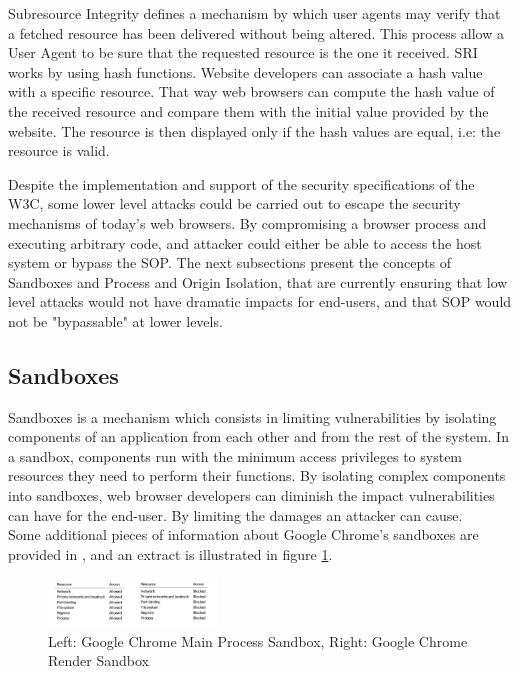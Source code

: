 \documentclass[journal]{IEEEtran}
\begin{document}
Subresource Integrity defines a mechanism by which user agents may verify that a fetched resource has been delivered without being altered. This process allow a User Agent to be sure that the requested resource is the one it received. SRI works by using hash functions. Website developers can associate a hash value with a specific resource. That way web browsers can compute the hash value of the received resource and compare them with the initial value provided by the website. The resource is then displayed only if the hash values are equal, i.e: the resource is valid. 

\medskip
\medskip

Despite the implementation and support of the security specifications of the W3C, some lower level attacks could be carried out to escape the security mechanisms of today's web browsers. By compromising a browser process and executing arbitrary code, and attacker could either be able to access the host system or bypass the SOP. The next subsections present the concepts of Sandboxes and Process and Origin Isolation, that are currently ensuring that low level attacks would not have dramatic impacts for end-users, and that SOP would not be "bypassable" at lower levels.

\subsection{Sandboxes}

Sandboxes is a mechanism which consists in limiting vulnerabilities by isolating components of an application from each other and from the rest of the system. In a sandbox, components run with the minimum access privileges to system resources they need to perform their functions.
By isolating complex components into sandboxes, web browser developers can diminish the impact vulnerabilities can have for the end-user. By limiting the damages an attacker can cause. \\

Some additional pieces of information about Google Chrome's sandboxes are provided in \cite{browserSecurityWhitePaper}, and an extract is illustrated in figure \ref{fig:ChromeSandboxes}.

\begin{figure}[h]
\centering
\includegraphics[width=0.4\textwidth]{images/SandboxesChrome.png}
\caption{Left: Google Chrome Main Process Sandbox, Right: Google Chrome Render Sandbox}
\label{fig:ChromeSandboxes}
\end{figure}
\end{document}

